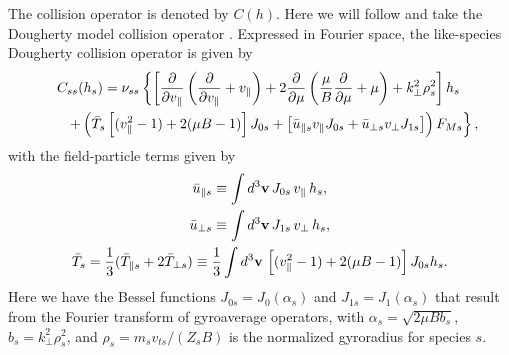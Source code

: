 \documentclass{jpp}
\begin{document}
The collision operator is denoted by $C(h)$. Here we will follow \cite{Mandell2018} and take the Dougherty model collision operator \citep{Dougherty1964}. Expressed in Fourier space, the like-species Dougherty collision operator is given by
\begin{gather}
C_{ss}(h_s) 
= \nu_{ss} \left\{ \left[ {\partial \over
     \partial v_\parallel} \left({\partial \over \partial v_\parallel}
   + v_\parallel \right) 
 + 2 {\partial \over \partial \mu} \left( {\mu \over B}
     {\partial \over \partial \mu} + \mu \right) + k_\perp^2\rho_s^2
     \right] h_s  \right. \notag \\
  \left. \qquad + \left(  \bar{T}_s \left[
      (v_\parallel^2 - 1) + 2 (\mu B - 1) \right] J_{0 s} +
  \left[ \bar{u}_{\parallel s}  v_\parallel J_{0 s} + 
    \bar{u}_{\perp s} v_\perp J_{1 s} \right] \right) F_{Ms} \right\},
\label{eq:fullC}
\end{gather}
with the field-particle terms given by
\begin{gather}
     \bar{u}_{\parallel s} \equiv \int d^3{\bf v} \, J_{0 s}\, v_\parallel \, h_s, \\
     \bar{u}_{\perp s} \equiv \int d^3{\bf v} \, J_{1 s}\, v_\perp \, h_s, \\
     \bar{T}_s = {1 \over 3} (\bar{T}_{\parallel s} + 2 \bar{T}_{\perp s}) \equiv {1 \over 3} \int d^3{\bf v} \, \left[ (v_\parallel^2 - 1) + 2 (\mu B - 1) \right] J_{0 s} h_s.
\end{gather}
Here we have the Bessel functions $J_{0 s}=J_{0}(\alpha_s)$ and $J_{1 s}=J_{1}(\alpha_s)$ that result from the Fourier transform of gyroaverage operators, with $\alpha_s = \sqrt{2\mu B b_s}$, $b_s = k_\perp^2 \rho_s^2$, {\color{black} and $\rho_s = m_s v_{ts}/(Z_s B)$ is the normalized gyroradius for species $s$.}
\end{document}
